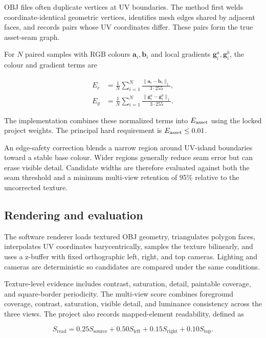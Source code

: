 OBJ files often duplicate vertices at UV boundaries. The method first welds
coordinate-identical geometric vertices, identifies mesh edges shared by adjacent
faces, and records pairs whose UV coordinates differ. These pairs form the true
asset-seam graph.

For $N$ paired samples with RGB colours $\mathbf{a}_i,\mathbf{b}_i$ and local
gradients $\mathbf{g}^{a}_i,\mathbf{g}^{b}_i$, the colour and gradient terms are

\begin{align}
  E_c &= \frac{1}{N}\sum_{i=1}^{N}
  \frac{\lVert\mathbf{a}_i-\mathbf{b}_i\rVert_1}{3\cdot255},\\
  E_g &= \frac{1}{N}\sum_{i=1}^{N}
  \frac{\lVert\mathbf{g}^{a}_i-\mathbf{g}^{b}_i\rVert_1}{3\cdot255}.
\end{align}

The implementation combines these normalized terms into $E_{\mathrm{asset}}$ using the
locked project weights. The principal hard requirement is
$E_{\mathrm{asset}}\leq0.01$.

An edge-safety correction blends a narrow region around UV-island boundaries
toward a stable base colour. Wider regions generally reduce seam error but can
erase visible detail. Candidate widths are therefore evaluated against both the
seam threshold and a minimum multi-view retention of 95\% relative to the
uncorrected texture.

\subsection{Rendering and evaluation}

The software renderer loads textured OBJ geometry, triangulates polygon faces,
interpolates UV coordinates barycentrically, samples the texture bilinearly, and
uses a z-buffer with fixed orthographic left, right, and top cameras. Lighting and
cameras are deterministic so candidates are compared under the same conditions.

Texture-level evidence includes contrast, saturation, detail, paintable coverage,
and square-border periodicity. The multi-view score combines foreground coverage,
contrast, saturation, visible detail, and luminance consistency across the three
views. The project also records mapped-element readability, defined as

\begin{equation}
  S_{\mathrm{read}} =
  0.25S_{\mathrm{source}}+
  0.50S_{\mathrm{left}}+
  0.15S_{\mathrm{right}}+
  0.10S_{\mathrm{top}}.
\end{equation}

